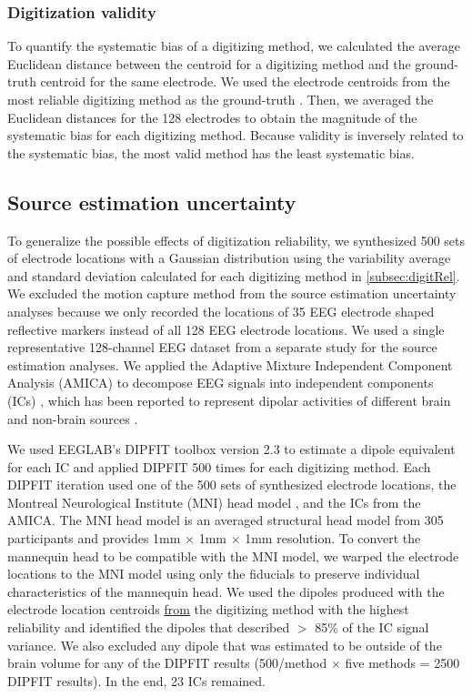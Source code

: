 \documentclass[../thesis_seyed.tex]{subfiles}
\begin{document}
\subsubsection{Digitization validity}
To quantify the systematic bias of a digitizing method, we calculated the average Euclidean distance between the centroid for a digitizing method and the ground-truth centroid for the same electrode. We used the electrode centroids from the most reliable digitizing method as the ground-truth \cite{Dalal2014-nk}. Then, we averaged the Euclidean distances for the 128 electrodes to obtain the magnitude of the systematic bias for each digitizing method. Because validity is inversely related to the systematic bias, the most valid method has the least systematic bias. 

\subsection{Source estimation uncertainty}
\label{subsec:soEst}
To generalize the possible effects of digitization reliability, we synthesized 500 sets of electrode locations with a Gaussian distribution using the variability average and standard deviation calculated for each digitizing method in \ref{subsec:digitRel}. We excluded the motion capture method from the source estimation uncertainty analyses because we only recorded the locations of 35 EEG electrode shaped reflective markers instead of all 128 EEG electrode locations. 
We used a single representative 128-channel EEG dataset from a separate study for the source estimation analyses. We applied the Adaptive Mixture Independent Component Analysis (AMICA) to decompose EEG signals into independent components (ICs) \cite{Palmer2007-sv}, which has been reported to represent dipolar activities of different brain and non-brain sources \cite{Delorme2012-re}. 

We used EEGLAB's DIPFIT toolbox version 2.3 to estimate a dipole equivalent for each IC and applied DIPFIT 500 times for each digitizing method. Each DIPFIT iteration used one of the 500 sets of synthesized electrode locations, the Montreal Neurological Institute (MNI) head model \cite{Evans1993-nx}, and the ICs from the AMICA. The MNI head model is an averaged structural head model from 305 participants and provides 1mm $\times$ 1mm $\times$ 1mm resolution. To convert the mannequin head to be compatible with the MNI model, we warped the electrode locations to the MNI model using only the fiducials to preserve individual characteristics of the mannequin head. We used the dipoles produced with the electrode location centroids \ul{from} the digitizing method with the highest reliability and identified the dipoles that described $>$ 85\% of the IC signal variance. We also excluded any dipole that was estimated to be outside of the brain volume for any of the DIPFIT results (500/method $\times$ five methods = 2500 DIPFIT results). In the end, 23 ICs remained.  
\end{document}
